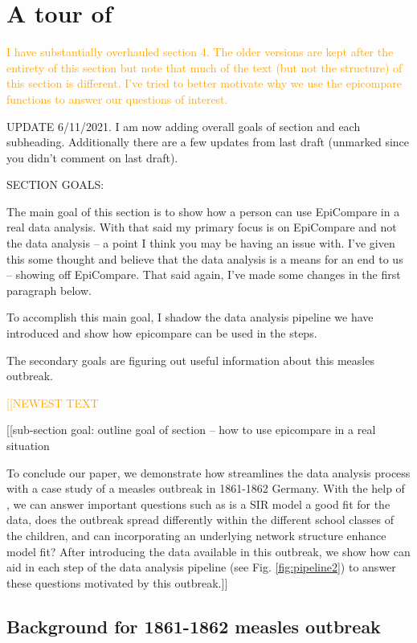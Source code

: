 \documentclass[
  shortnames]{jss}
\begin{document}
\section[Tour]{A tour of }\label{sec:tour}

\textcolor{orange}{I have substantially overhauled section 4.  The older versions are kept after the entirety of this section but note that much of the text (but not the structure) of this section is different.  I've tried to better motivate why we use the epicompare functions to answer our questions of interest.}

UPDATE 6/11/2021. I am now adding overall goals of section and each
subheading. Additionally there are a few updates from last draft
(unmarked since you didn't comment on last draft).

SECTION GOALS:

The main goal of this section is to show how a person can use EpiCompare
in a real data analysis. With that said my primary focus is on
EpiCompare and not the data analysis -- a point I think you may be
having an issue with. I've given this some thought and believe that the
data analysis is a means for an end to us -- showing off EpiCompare.
That said again, I've made some changes in the first paragraph below.

To accomplish this main goal, I shadow the data analysis pipeline we
have introduced and show how epicompare can be used in the steps.

The secondary goals are figuring out useful information about this
measles outbreak.

\textcolor{orange}{[[NEWEST TEXT}

{[}{[}sub-section goal: outline goal of section -- how to use epicompare
in a real situation

To conclude our paper, we demonstrate how  streamlines
the data analysis process with a case study of a measles outbreak in
1861-1862 Germany. With the help of , we can answer
important questions such as is a SIR model a good fit for the data, does
the outbreak spread differently within the different school classes of
the children, and can incorporating an underlying network structure
enhance model fit? After introducing the data available in this
outbreak, we show how  can aid in each step of the data
analysis pipeline (see Fig. \ref{fig:pipeline2}) to answer these
questions motivated by this outbreak.{]}{]}

\hypertarget{background-for-1861-1862-measles-outbreak}{%
\subsection{Background for 1861-1862 measles
outbreak}\label{background-for-1861-1862-measles-outbreak}}
\end{document}
